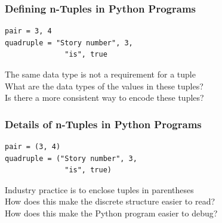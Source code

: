 \documentclass[14pt,aspectratio=169]{beamer}
\begin{document}
%
\begin{frame}[fragile]
  \frametitle{Defining n-Tuples in Python Programs}
  \normalsize
  \begin{minipage}{6in}
    \vspace*{.25in}
    \begin{verbatim}
pair = 3, 4
quadruple = "Story number", 3,
              "is", true
    \end{verbatim}
  \end{minipage}
  \vspace*{.25in}
  \begin{center}
    \normalsize \noindent The same data type is not a requirement for a tuple \\
    \normalsize \noindent What are the data types of the values in these tuples? \\
    \normalsize \noindent Is there a more consistent way to encode these tuples? \\
  \end{center}
\end{frame}

%
\begin{frame}[fragile]
  \frametitle{Details of n-Tuples in Python Programs}
  \normalsize
  \begin{minipage}{6in}
    \vspace*{.25in}
    \begin{verbatim}
pair = (3, 4)
quadruple = ("Story number", 3,
              "is", true)
    \end{verbatim}
  \end{minipage}
  \vspace*{.25in}
  \begin{center}
    \normalsize \noindent Industry practice is to enclose tuples in parentheses \\
    \normalsize \noindent How does this make the discrete structure easier to
    read? \\
    \normalsize \noindent How does this make the Python program easier to debug? \\
  \end{center}
\end{frame}
\end{document}
